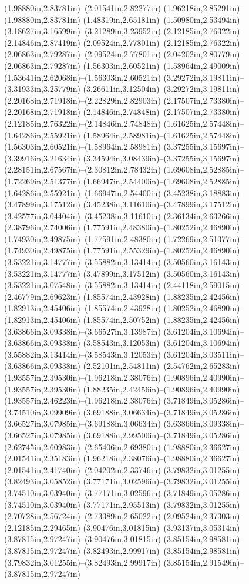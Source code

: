 (1.98880in,2.83781in)--(2.01541in,2.82277in) (1.96218in,2.85291in)--(1.98880in,2.83781in) (1.48319in,2.65181in)--(1.50980in,2.53494in) (3.18627in,3.16599in)--(3.21289in,3.23952in) (2.12185in,2.76322in)--(2.14846in,2.87419in) (2.09524in,2.77801in)--(2.12185in,2.76322in) (2.06863in,2.79287in)--(2.09524in,2.77801in) (2.04202in,2.80779in)--(2.06863in,2.79287in) (1.56303in,2.60521in)--(1.58964in,2.49009in) (1.53641in,2.62068in)--(1.56303in,2.60521in) (3.29272in,3.19811in)--(3.31933in,3.25779in) (3.26611in,3.12504in)--(3.29272in,3.19811in) (2.20168in,2.71918in)--(2.22829in,2.82903in) (2.17507in,2.73380in)--(2.20168in,2.71918in) (2.14846in,2.74848in)--(2.17507in,2.73380in) (2.12185in,2.76322in)--(2.14846in,2.74848in) (1.61625in,2.57448in)--(1.64286in,2.55921in) (1.58964in,2.58981in)--(1.61625in,2.57448in) (1.56303in,2.60521in)--(1.58964in,2.58981in) (3.37255in,3.15697in)--(3.39916in,3.21634in) (3.34594in,3.08439in)--(3.37255in,3.15697in) (2.28151in,2.67567in)--(2.30812in,2.78432in) (1.69608in,2.52885in)--(1.72269in,2.51377in) (1.66947in,2.54400in)--(1.69608in,2.52885in) (1.64286in,2.55921in)--(1.66947in,2.54400in) (3.45238in,3.18883in)--(3.47899in,3.17512in) (3.45238in,3.11610in)--(3.47899in,3.17512in) (3.42577in,3.04404in)--(3.45238in,3.11610in) (2.36134in,2.63266in)--(2.38796in,2.74006in) (1.77591in,2.48380in)--(1.80252in,2.46890in) (1.74930in,2.49875in)--(1.77591in,2.48380in) (1.72269in,2.51377in)--(1.74930in,2.49875in) (1.77591in,2.55329in)--(1.80252in,2.46890in) (3.53221in,3.14777in)--(3.55882in,3.13414in) (3.50560in,3.16143in)--(3.53221in,3.14777in) (3.47899in,3.17512in)--(3.50560in,3.16143in) (3.53221in,3.07548in)--(3.55882in,3.13414in) (2.44118in,2.59015in)--(2.46779in,2.69623in) (1.85574in,2.43928in)--(1.88235in,2.42456in) (1.82913in,2.45406in)--(1.85574in,2.43928in) (1.80252in,2.46890in)--(1.82913in,2.45406in) (1.85574in,2.50752in)--(1.88235in,2.42456in) (3.63866in,3.09338in)--(3.66527in,3.13987in) (3.61204in,3.10694in)--(3.63866in,3.09338in) (3.58543in,3.12053in)--(3.61204in,3.10694in) (3.55882in,3.13414in)--(3.58543in,3.12053in) (3.61204in,3.03511in)--(3.63866in,3.09338in) (2.52101in,2.54811in)--(2.54762in,2.65283in) (1.93557in,2.39530in)--(1.96218in,2.38076in) (1.90896in,2.40990in)--(1.93557in,2.39530in) (1.88235in,2.42456in)--(1.90896in,2.40990in) (1.93557in,2.46223in)--(1.96218in,2.38076in) (3.71849in,3.05286in)--(3.74510in,3.09909in) (3.69188in,3.06634in)--(3.71849in,3.05286in) (3.66527in,3.07985in)--(3.69188in,3.06634in) (3.63866in,3.09338in)--(3.66527in,3.07985in) (3.69188in,2.99500in)--(3.71849in,3.05286in) (2.62745in,2.60983in)--(2.65406in,2.69380in) (1.98880in,2.36627in)--(2.01541in,2.35183in) (1.96218in,2.38076in)--(1.98880in,2.36627in) (2.01541in,2.41740in)--(2.04202in,2.33746in) (3.79832in,3.01255in)--(3.82493in,3.05852in) (3.77171in,3.02596in)--(3.79832in,3.01255in) (3.74510in,3.03940in)--(3.77171in,3.02596in) (3.71849in,3.05286in)--(3.74510in,3.03940in) (3.77171in,2.95513in)--(3.79832in,3.01255in) (2.70728in,2.56724in)--(2.73389in,2.65022in) (2.09524in,2.37303in)--(2.12185in,2.29465in) (3.90476in,3.01815in)--(3.93137in,3.05314in) (3.87815in,2.97247in)--(3.90476in,3.01815in) (3.85154in,2.98581in)--(3.87815in,2.97247in) (3.82493in,2.99917in)--(3.85154in,2.98581in) (3.79832in,3.01255in)--(3.82493in,2.99917in) (3.85154in,2.91549in)--(3.87815in,2.97247in) 